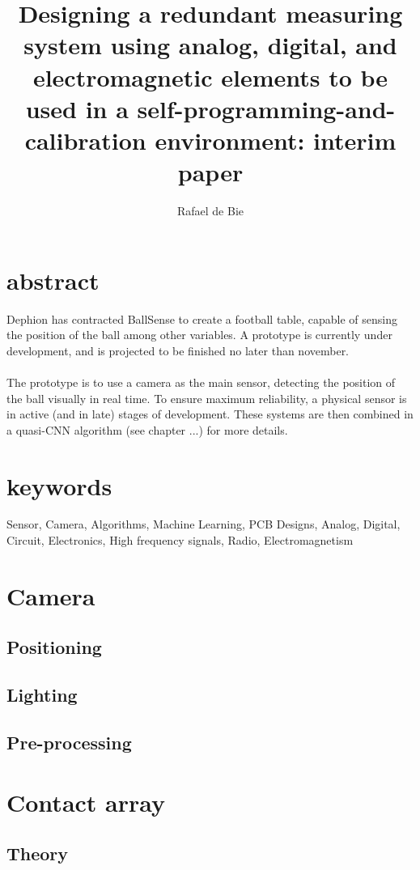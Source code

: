 \documentclass[11pt]{article} %
\title{Designing a redundant measuring system using analog, digital, and electromagnetic elements to be used in a self-programming-and-calibration environment: interim paper}
\author{Rafael de Bie}
\begin{document}
\maketitle

\section{abstract}

Dephion has contracted BallSense to create a football table, capable of sensing the position of the ball among other variables. A prototype is currently under development, and is projected to be finished no later than november. \\
\\
The prototype is to use a camera as the main sensor, detecting the position of the ball visually in real time. To ensure maximum reliability, a physical sensor is in active (and in late) stages of development. These systems are then combined in a quasi-CNN algorithm (see chapter ...) for more details.

\section{keywords}

Sensor, Camera, Algorithms, Machine Learning, PCB Designs, Analog, Digital, Circuit, Electronics, High frequency signals, Radio, Electromagnetism

\pagebreak

\section{Camera}

\subsection{Positioning}
\subsection{Lighting}
\subsection{Pre-processing}

\section{Contact array}

\subsection{Theory}
\end{document}
